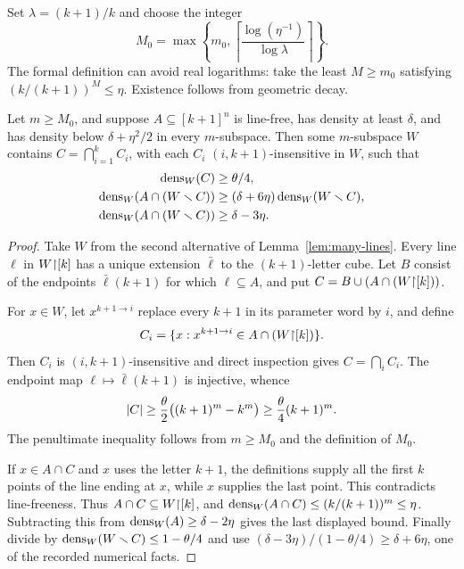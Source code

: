 Set $\lambda=(k+1)/k$ and choose the integer
\begin{equation}
\label{eq:M0}
 M_0=\max\left\{m_0,
 \left\lceil\frac{\log(\eta^{-1})}{\log\lambda}\right\rceil\right\}.
\end{equation}
The formal definition can avoid real logarithms: take the least $M\geq m_0$ satisfying
$(k/(k+1))^M\leq\eta$.  Existence follows from geometric decay.

\begin{lemma}
\label{lem:large-insensitive-intersection}
Let $m\geq M_0$, and suppose $A\subseteq[k+1]^n$ is line-free, has density at least $\delta$, and
has density below $\delta+\eta^2/2$ in every $m$-subspace.  Then some $m$-subspace $W$ contains
$C=\bigcap_{i=1}^k C_i$, with each $C_i$ $(i,k+1)$-insensitive in $W$, such that
\begin{align*}
 \operatorname{dens}_W(C)&\geq\theta/4,\\
 \operatorname{dens}_W(A\cap(W\smallsetminus C))&\geq(\delta+6\eta)\operatorname{dens}_W(W\smallsetminus C),\\
 \operatorname{dens}_W(A\cap(W\smallsetminus C))&\geq\delta-3\eta.
\end{align*}
\end{lemma}

\begin{proof}
Take $W$ from the second alternative of Lemma~\ref{lem:many-lines}.  Every line $\ell$ in
$W\mathord{\upharpoonright}[k]$ has a unique extension $\bar\ell$ to the $(k+1)$-letter cube.  Let $B$ consist of
the endpoints $\bar\ell(k+1)$ for which $\ell\subseteq A$, and put
$C=B\cup(A\cap(W\mathord{\upharpoonright}[k]))$.

For $x\in W$, let $x^{k+1\to i}$ replace every $k+1$ in its parameter word by $i$, and define
\[
 C_i=\{x:x^{k+1\to i}\in A\cap(W\mathord{\upharpoonright}[k])\}.
\]
Then $C_i$ is $(i,k+1)$-insensitive and direct inspection gives $C=\bigcap_iC_i$.  The endpoint
map $\ell\mapsto\bar\ell(k+1)$ is injective, whence
\[
 \lvert C\rvert\geq\frac\theta2\big((k+1)^m-k^m\big)
 \geq\frac\theta4(k+1)^m.
\]
The penultimate inequality follows from $m\geq M_0$ and the definition of $M_0$.

If $x\in A\cap C$ and $x$ uses the letter $k+1$, the definitions supply all the first $k$ points
of the line ending at $x$, while $x$ supplies the last point.  This contradicts line-freeness.
Thus $A\cap C\subseteq W\mathord{\upharpoonright}[k]$, and
$\operatorname{dens}_W(A\cap C)\leq(k/(k+1))^m\leq\eta$.  Subtracting this from
$\operatorname{dens}_W(A)\geq\delta-2\eta$ gives the last displayed bound.  Finally divide by
$\operatorname{dens}_W(W\smallsetminus C)\leq1-\theta/4$ and use
$(\delta-3\eta)/(1-\theta/4)\geq\delta+6\eta$, one of the recorded numerical facts.
\end{proof}

